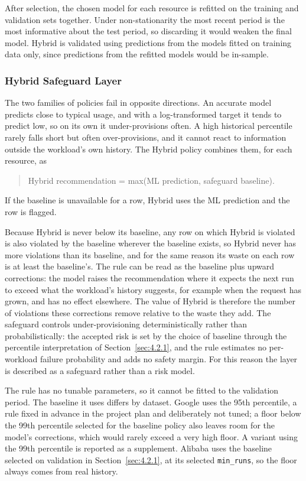 After selection, the chosen model for each resource is refitted on the training and validation sets together. Under non-stationarity the most recent period is the most informative about the test period, so discarding it would weaken the final model. Hybrid is validated using predictions from the models fitted on training data only, since predictions from the refitted models would be in-sample.

\subsubsection{Hybrid Safeguard Layer}\label{sec:4.2.3}

The two families of policies fail in opposite directions. An accurate model predicts close to typical usage, and with a log-transformed target it tends to predict low, so on its own it under-provisions often. A high historical percentile rarely falls short but often over-provisions, and it cannot react to information outside the workload's own history. The Hybrid policy combines them, for each resource, as

\begin{quote}
Hybrid recommendation = max(ML prediction, safeguard baseline).
\end{quote}

If the baseline is unavailable for a row, Hybrid uses the ML prediction and the row is flagged.

Because Hybrid is never below its baseline, any row on which Hybrid is violated is also violated by the baseline wherever the baseline exists, so Hybrid never has more violations than its baseline, and for the same reason its waste on each row is at least the baseline's. The rule can be read as the baseline plus upward corrections: the model raises the recommendation where it expects the next run to exceed what the workload's history suggests, for example when the request has grown, and has no effect elsewhere. The value of Hybrid is therefore the number of violations these corrections remove relative to the waste they add. The safeguard controls under-provisioning deterministically rather than probabilistically: the accepted risk is set by the choice of baseline through the percentile interpretation of Section~\ref{sec:4.2.1}, and the rule estimates no per-workload failure probability and adds no safety margin. For this reason the layer is described as a safeguard rather than a risk model.

The rule has no tunable parameters, so it cannot be fitted to the validation period. The baseline it uses differs by dataset. Google uses the 95th percentile, a rule fixed in advance in the project plan and deliberately not tuned; a floor below the 99th percentile selected for the baseline policy also leaves room for the model's corrections, which would rarely exceed a very high floor. A variant using the 99th percentile is reported as a supplement. Alibaba uses the baseline selected on validation in Section~\ref{sec:4.2.1}, at its selected \texttt{min\_runs}, so the floor always comes from real history.

